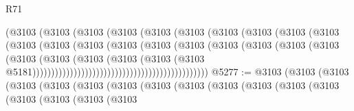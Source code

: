\begin{lexlean}{R71}
\begin{coremodule}
                                              (@3103
                                                (@3103
                                                  (@3103
                                                    (@3103
                                                      (@3103
                                                        (@3103
                                                          (@3103
                                                            (@3103
                                                              (@3103
                                                                (@3103
                                                                  (@3103
                                                                    (@3103
                                                                      (@3103
                                                                        (@3103
                                                                          (@3103
                                                                            (@3103
                                                                              (@3103
                                                                                (@3103
                                                                                  (@3103
                                                                                    (@3103
                                                                                      (@3103
                                                                                        (@3103
                                                                                          (@3103
                                                                                            (@3103
                                                                                              (@3103
                                                                                                (@3103
                                                                                                  @5181)))))))))))))))))))))))))))))))))))))))))))))))
@5277 := @3103
    (@3103
      (@3103
        (@3103
          (@3103
            (@3103
              (@3103
                (@3103
                  (@3103
                    (@3103
                      (@3103
                        (@3103
                          (@3103
                            (@3103
                              (@3103
                                (@3103
                                  (@3103

\end{coremodule}
\end{lexlean}
